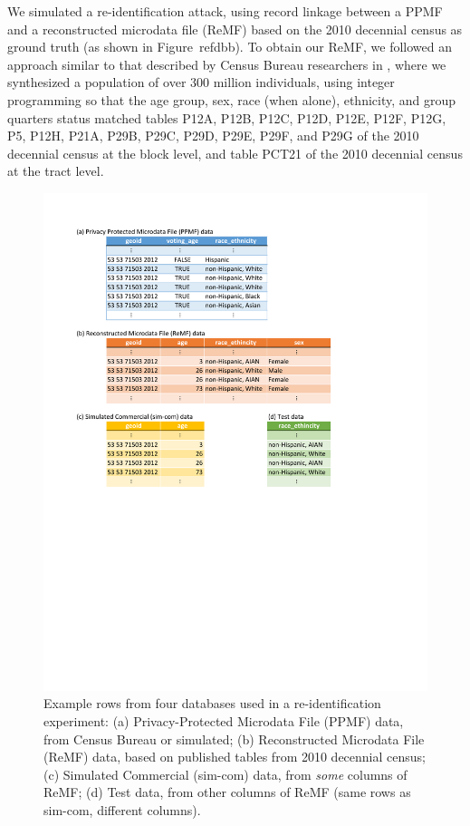 \documentclass{article}
\begin{document}
We simulated a re-identification attack, using record linkage between a PPMF and a reconstructed microdata file (ReMF) based on the 2010 decennial census as ground truth (as shown in Figure~ref{db}b). To obtain our ReMF, we followed an approach similar to that described by Census Bureau researchers in \cite{garfinkel2019understanding}, where we synthesized a population of over 300 million individuals, using integer programming so that the age group, sex, race (when alone), ethnicity, and group quarters status matched tables P12A, P12B, P12C, P12D, P12E, P12F, P12G, P5, P12H, P21A, P29B, P29C, P29D, P29E, P29F, and P29G of the 2010 decennial census at the block level, and table PCT21 of the 2010 decennial census at the tract level.

\begin{figure}[ht]
\vskip 0.2in
\begin{center}
\centerline{\includegraphics[width=\columnwidth]{tex/ppmf_reid_db_fig_cropped.pdf}}
\caption{Example rows from four databases used in a re-identification experiment: (a) Privacy-Protected Microdata File (PPMF) data, from Census Bureau or simulated; (b) Reconstructed Microdata File (ReMF) data, based on published tables from 2010 decennial census; (c) Simulated Commercial (sim-com) data, from \emph{some} columns of ReMF; (d) Test data, from other columns of ReMF (same rows as sim-com, different columns).}
\label{db}
\end{center}
\vskip -0.2in
\end{figure}
\end{document}
